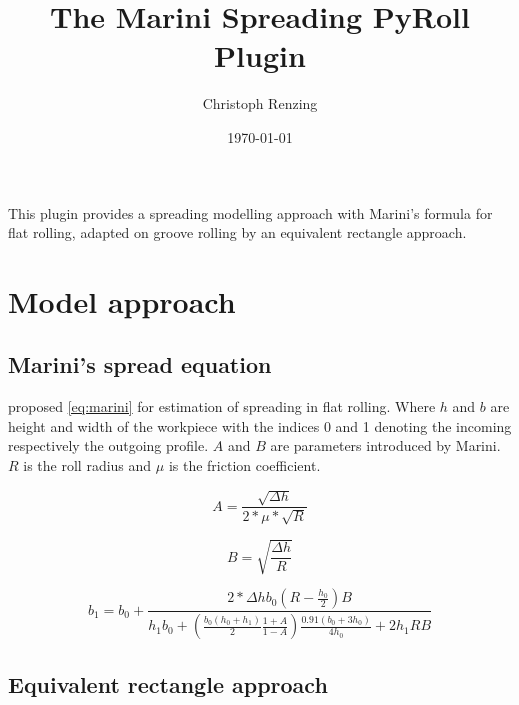 \documentclass[11pt]{PyRollDocs}
\begin{document}
    \title{The Marini Spreading PyRoll Plugin}
    \author{Christoph Renzing}
    \date{\today}

    \maketitle

    This plugin provides a spreading modelling approach with Marini's formula for flat rolling, adapted on groove rolling by an equivalent rectangle approach.


    \section{Model approach}\label{sec:model-approach}

    \subsection{Marini's spread equation}\label{subsec:marinis's-spread-equation}

    \textcite{Marini1941} proposed \autoref{eq:marini} for estimation of spreading in flat rolling.
    Where $h$ and $b$ are height and width of the workpiece with the indices 0 and 1 denoting the incoming respectively the outgoing profile.
    $A$ and $B$ are parameters introduced by Marini.
    $R$ is the roll radius and $\mu$ is the friction coefficient.


    \begin{equation}
        A = \frac{\sqrt{\Delta h}}{2 * \mu * \sqrt{R}}
        \label{eq:marini-parameter-a}
    \end{equation}

    \begin{equation}
        B = \sqrt{\frac{\Delta h}{R}}
        \label{eq:marini-parameter-b}
    \end{equation}

    \begin{equation}
        b_1 = b_0 + \frac{2 * \Delta h b_0 \left( R - \frac{h_0}{2} \right) B }{h_1 b_0 + \left( \frac{b_0 \left( h_0 + h_1 \right)}{2} \frac{1 + A}{1 - A} \right) \frac{0.91 \left( b_0 + 3 h_0 \right)}{4 h_0} + 2 h_1 R B}
        \label{eq:marini}
    \end{equation}

    \subsection{Equivalent rectangle approach}\label{subsec:equivalent-rectangle-approach}
\end{document}
